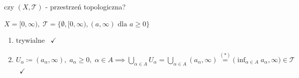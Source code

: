 \documentclass[a4paper,12pt]{article}
\begin{document}
\bigskip
{} \; czy \((X, \mathcal{T})\) - przestrzeń topologiczna?
\begin{podpunkty}
    \item \(X = [0, \infty), \; \mathcal{T} = \{\emptyset, [0, \infty), (a, \infty) \text{ dla } a \geq 0\}\)
    \begin{enumerate}[label=\roman*), leftmargin=1.9em, itemsep=0.2em, topsep=0.2em, parsep=0pt, partopsep=0pt]
        \item trywialne \, \(\checkmark\)
        \item \(U_\alpha \coloneqq (a_\alpha, \infty), \; a_\alpha \geq 0, \; \alpha \in A \implies \bigcup_{\alpha \in A} U_\alpha = \bigcup_{\alpha \in A} (a_\alpha, \infty) \overset{(*)}{=} \big(\inf_{\alpha \in A} a_\alpha, \infty\big) \in \mathcal{T}\) \, \(\checkmark\)


\end{enumerate}
\end{podpunkty}
\end{document}

